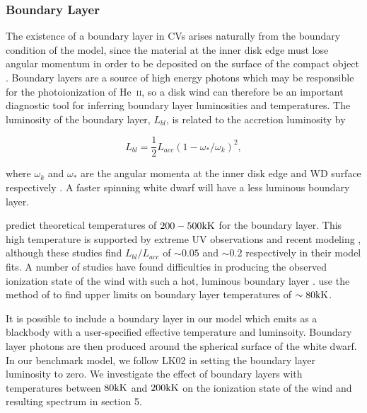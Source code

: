 \documentclass[preprint, a4paper, 11pt]{aastex}
\begin{document}
\subsubsection{Boundary Layer}
The existence of a boundary layer in CVs arises naturally from the boundary condition
of the \cite{shakurasunyaev1973} model, since the material at the inner disk
edge must lose angular momentum in order to be deposited on
the surface of the compact object \cite[see e.g.][]{lyndenbell1974}.
Boundary layers are a source of
high energy photons which may be responsible for the photoionization of 
He~\textsc{ii}, so a disk wind can therefore be an important diagnostic
tool for inferring boundary layer luminosities and temperatures. 
The luminosity of the boundary layer, $L_{bl}$, is related to the accretion luminosity
by

\begin{equation}
L_{bl} = \frac{1}{2} L_{acc} (1 - \omega_* / \omega_k)^2,
\end{equation}

where $\omega_k$ and $\omega_*$ are the angular momenta at the inner disk edge
and WD surface respectively \citep{fkrbook}. A faster spinning white dwarf 
will have a less luminous boundary layer.


\cite{pringlesavonije1979} predict theoretical temperatures of 
$200-500{\rm kK}$ for the boundary layer.
This high temperature is supported by extreme UV observations \citep{mauche2004}
and recent modeling \citep{suleimanov2014}, although these studies 
find $L_{bl}/L_{acc}$ of $\sim0.05$ and $\sim0.2$ respectively in their
model fits. A number of studies have found difficulties
in producing the observed ionization state of the wind
with such a hot, luminous boundary layer 
\citep[see e.g.][]{maucheraymond1987, drewverbunt1985}.
\cite{hoare1991}
use the method of \cite{zanstra1929} to find upper limits on 
boundary layer temperatures of $\sim80{\rm kK}$.

It is possible to include a boundary layer in our model which emits 
as a blackbody with a user-specified effective temperature and luminsoity.
Boundary layer photons are then produced around the spherical surface of the 
white dwarf. In our benchmark model, we follow LK02 in setting the boundary layer
luminosity to zero. We investigate the effect
of boundary layers with temperatures between $80{\rm kK}$ and $200{\rm kK}$ 
on the ionization state of the wind and resulting
spectrum in section 5.
\end{document}
